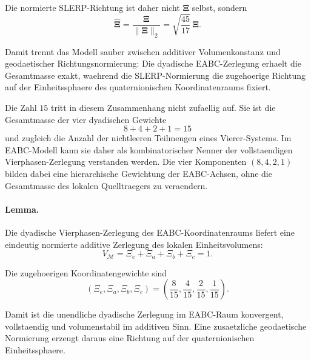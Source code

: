 \documentclass[a4paper,11pt]{article}
\begin{document}
Die normierte SLERP-Richtung ist daher nicht \(\boldsymbol{\Xi}\) selbst,
sondern
\[
\widehat{\boldsymbol{\Xi}}
=
\frac{\boldsymbol{\Xi}}{\lVert\boldsymbol{\Xi}\rVert_2}
=
\sqrt{\frac{45}{17}}\,\boldsymbol{\Xi}.
\]

Damit trennt das Modell sauber zwischen additiver Volumenkonstanz und
geodaetischer Richtungsnormierung: Die dyadische EABC-Zerlegung erhaelt die
Gesamtmasse exakt, waehrend die SLERP-Normierung die zugehoerige Richtung auf
der Einheitssphaere des quaternionischen Koordinatenraums fixiert.

Die Zahl \(15\) tritt in diesem Zusammenhang nicht zufaellig auf. Sie ist die
Gesamtmasse der vier dyadischen Gewichte
\[
8+4+2+1=15
\]
und zugleich die Anzahl der nichtleeren Teilmengen eines Vierer-Systems. Im
EABC-Modell kann sie daher als kombinatorischer Nenner der vollstaendigen
Vierphasen-Zerlegung verstanden werden. Die vier Komponenten \((8,4,2,1)\)
bilden dabei eine hierarchische Gewichtung der EABC-Achsen, ohne die
Gesamtmasse des lokalen Quelltraegers zu veraendern.

\paragraph{Lemma.}
Die dyadische Vierphasen-Zerlegung des EABC-Koordinatenraums liefert eine
eindeutig normierte additive Zerlegung des lokalen Einheitsvolumens:
\[
V_{\mathcal M}
=
\Xi_e+\Xi_a+\Xi_b+\Xi_c
=
1.
\]

Die zugehoerigen Koordinatengewichte sind
\[
(\Xi_e,\Xi_a,\Xi_b,\Xi_c)
=
\left(
\frac{8}{15},
\frac{4}{15},
\frac{2}{15},
\frac{1}{15}
\right).
\]

Damit ist die unendliche dyadische Zerlegung im EABC-Raum konvergent,
vollstaendig und volumenstabil im additiven Sinn. Eine zusaetzliche
geodaetische Normierung erzeugt daraus eine Richtung auf der quaternionischen
Einheitssphaere.
\end{document}
